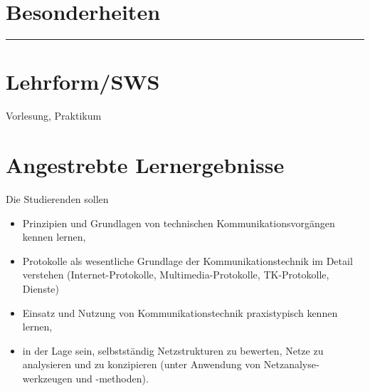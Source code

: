\hypertarget{besonderheitenpathlabel....srcmodulbeschreibungen-bachelor-bpo5ba_kommunikationstechnikundnetze}{%
\section*{Besonderheiten\label{../../src/modulbeschreibungen-bachelor-bpo5/BA_KommunikationstechnikundNetze}}\label{besonderheitenpathlabel....srcmodulbeschreibungen-bachelor-bpo5ba_kommunikationstechnikundnetze}}

\begin{center}\rule{0.5\linewidth}{0.5pt}\end{center}

\hypertarget{lehrformswspathlabel....srcmodulbeschreibungen-bachelor-bpo5ba_kommunikationstechnikundnetze}{%
\section*{Lehrform/SWS\label{../../src/modulbeschreibungen-bachelor-bpo5/BA_KommunikationstechnikundNetze}}\label{lehrformswspathlabel....srcmodulbeschreibungen-bachelor-bpo5ba_kommunikationstechnikundnetze}}

Vorlesung, Praktikum

\hypertarget{angestrebte-lernergebnissepathlabel....srcmodulbeschreibungen-bachelor-bpo5ba_kommunikationstechnikundnetze}{%
\section*{Angestrebte
Lernergebnisse\label{../../src/modulbeschreibungen-bachelor-bpo5/BA_KommunikationstechnikundNetze}}\label{angestrebte-lernergebnissepathlabel....srcmodulbeschreibungen-bachelor-bpo5ba_kommunikationstechnikundnetze}}

Die Studierenden sollen

\begin{itemize}
\tightlist
\item
  Prinzipien und Grundlagen von technischen Kommunikations­vor­gängen
  kennen lernen,
\item
  Protokolle als wesentliche Grundlage der Kommunikationstechnik im
  Detail verstehen (Internet-Protokolle, Multimedia-Protokolle,
  TK-Protokolle, Dienste)
\item
  Einsatz und Nutzung von Kommunikations­tech­nik praxistypisch kennen
  lernen,
\item
  in der Lage sein, selbstständig Netzstrukturen zu bewerten, Netze zu
  analysieren und zu konzipieren (unter Anwendung von
  Netz­analyse­werkzeugen und -methoden).
\end{itemize}

